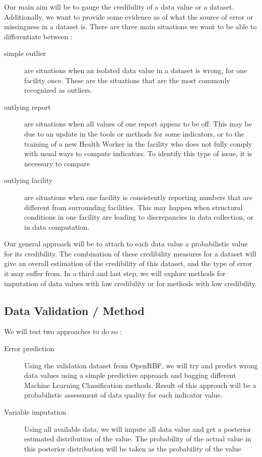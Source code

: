Our main aim will be to gauge the credibility of a data value or a dataset.  Additionally, we want to provide some evidence as of what the source of error or missingness in a dataset is. There are three main situations we want to be able to differentiate between :
\begin{description}
\item[simple outlier] are situations when an isolated data value in a dataset is wrong, for one facility once. These are the situations that are the most commonly recognized as outliers.
\item[outlying report] are situations when all values of one report appear to be off. This may be due to an update in the tools or methods for some indicators, or to the training of a new Health Worker in the facility who does not fully comply with usual ways to compute indicators. To identify this type of issue, it is necessary to compare
\item[outlying facility] are situations when one facility is consistently reporting numbers that are different from surrounding facilities. This may happen when structural conditions in one facility are leading to discrepancies in data collection, or in data computation.
\end{description}

Our general approach will be to attach to each data value a probabilistic value for its credibility. The combination of these credibility measures for a dataset will give an overall estimation of the credibility of this dataset, and the type of error it may suffer from. In a third and last step, we will explore methods for imputation of data values with low credibility or for methods with low credibility.


\subsection{Data Validation / Method}


We will test two approaches to do so :

\begin{description}
\item[Error prediction] Using the validation dataset from OpenRBF, we will try and predict wrong data values using a simple predictive approach and bagging different Machine Learning Classification methods. Result of this approach will be a probabilistic assessment of data quality for each indicator value.
\item[Variable imputation] Using all available data, we will impute all data value and get a posterior estimated distribution of the value. The probability of the actual value in this posterior distribution will be taken as the probability of the value
\end{description}

